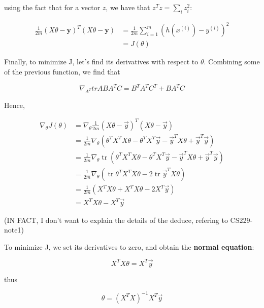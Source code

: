 \documentclass[fontset=windows,pass]{article}
\numberwithin{equation}{subsection} %
\begin{document}
using the fact that for a vector $z$, we have that $z^T z = \sum_{i}^{} z_i^2$:

\begin{align*}
	\frac{1}{2m} \left(X \theta - \boldsymbol{y}\right)^T \left(X \theta - \boldsymbol{y}\right) & = 
	\frac{1}{2m} \sum_{i=1}^{m} \left(h(x^{(i)}) - y^{(i)}\right)^2 \\
	& = J(\theta)
\end{align*}

Finally, to minimize J, let's find its derivatives with respect to $\theta$. Combining some of the previous function,
we find that

\begin{equation}
	\nabla_{A^T} tr ABA^{T}C = B^{T}A^{T}C^{T} + BA^{T}C
\end{equation}

Hence,

\begin{align*}
		\nabla_{\theta} J(\theta) & = \nabla_{\theta} \frac{1}{2m}(X \theta-\vec{y})^{T}(X \theta-\vec{y}) \\
		                          & = \frac{1}{2m} \nabla_{\theta}\left(\theta^{T} X^{T} X \theta-\theta^{T} X^{T} \vec{y}-\vec{y}^{T} X \theta+\vec{y}^{T} \vec{y}\right) \\
		                          & = \frac{1}{2m} \nabla_{\theta} \operatorname{tr}\left(\theta^{T} X^{T} X \theta-\theta^{T} X^{T} \vec{y}-\vec{y}^{T} X \theta+\vec{y}^{T} \vec{y}\right) \\
		                          & = \frac{1}{2m} \nabla_{\theta}\left(\operatorname{tr} \theta^{T} X^{T} X \theta-2 \operatorname{tr} \vec{y}^{T} X \theta\right) \\
		                          & = \frac{1}{2m}\left(X^{T} X \theta+X^{T} X \theta-2 X^{T} \vec{y}\right) \\
		                          & = X^{T} X \theta-X^{T} \vec{y}
\end{align*}

(IN FACT, I don't want to explain the details of the deduce, refering to CS229-note1)

To minimize J, we set its derivatives to zero, and obtain the \textbf{normal equation}:

\begin{equation}
	X^{T}X\theta = X^{T}\vec{y}
\end{equation}

thus

\begin{equation*}
	\theta = \left( X^{T}X \right)^{-1} X^{T}\vec{y}
\end{equation*}
\end{document}
